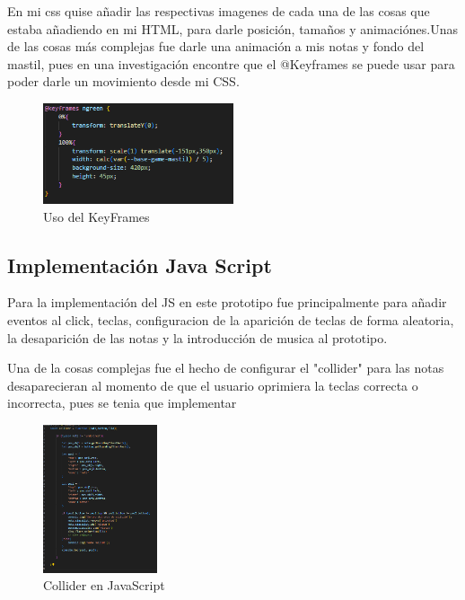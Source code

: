 \documentclass[conference]{IEEEtran}
\begin{document}
En mi css quise añadir las respectivas imagenes de cada una de las cosas que estaba añadiendo en mi HTML, para darle posición, tamaños y animaciónes.Unas de las cosas más complejas fue darle una animación a mis notas y fondo del mastil, pues en una investigación encontre que el @Keyframes se puede usar para poder darle un movimiento desde mi CSS.

\begin{figure}[h] %
    \centering
    \includegraphics[width=0.5\textwidth]{KeyFrames.png} %
    \caption{Uso del KeyFrames}
    \label{fig:mi_imagen}
\end{figure}



\subsection{Implementación Java Script}

Para la implementación del JS en este prototipo fue principalmente para añadir eventos al click, teclas, configuracion de la aparición de teclas de forma aleatoria, la desaparición de las notas y la introducción de musica al prototipo.

Una de la cosas complejas fue el hecho de configurar el "collider"
para las notas desaparecieran al momento de que el usuario oprimiera la teclas correcta o incorrecta, pues se tenia que implementar 

\begin{figure}[h] %
    \centering
    \includegraphics[width=0.3\textwidth]{collider.png} %
    \caption{Collider en JavaScript}
    \label{fig:mi_imagen}
\end{figure}
\end{document}
